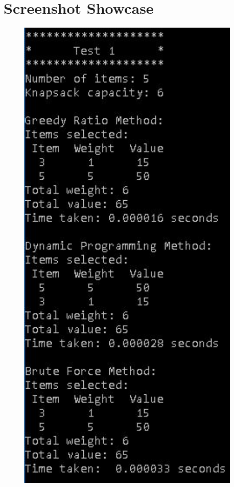 \documentclass{article}
\begin{document}
\newpage
\section{Screenshot Showcase}
\begin{figure}[H]
    \centering
    \begin{minipage}{0.49\textwidth}
        \centering
        \includegraphics[width=0.95\textwidth]{test1.JPG}

\end{minipage}
\end{figure}
\end{document}
